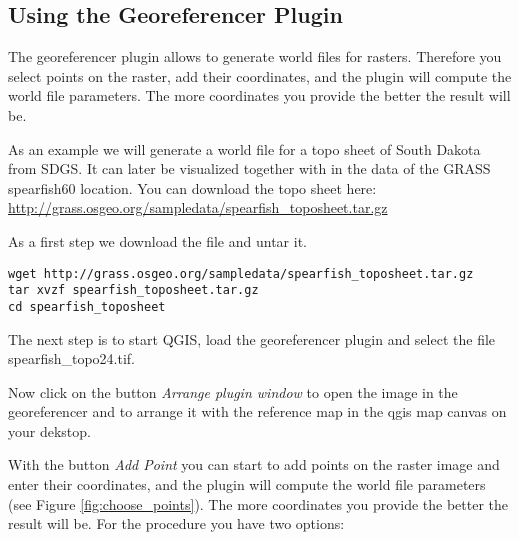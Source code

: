 \subsection{Using the Georeferencer Plugin}

The georeferencer plugin allows to generate world files for rasters. Therefore
you select points on the raster, add their coordinates, and the plugin will 
compute the world file parameters. The more coordinates you provide the better 
the result will be.

As an example we will generate a world file for a topo sheet of South Dakota 
from SDGS. It can later be visualized together with in the data of the GRASS 
spearfish60 location. You can download the topo sheet here: \\
\url{http://grass.osgeo.org/sampledata/spearfish\_toposheet.tar.gz}

As a first step we download the file and untar it.

\begin{verbatim}
wget http://grass.osgeo.org/sampledata/spearfish_toposheet.tar.gz
tar xvzf spearfish_toposheet.tar.gz
cd spearfish_toposheet
\end{verbatim}

The next step is to start QGIS, load the georeferencer plugin and select 
the file spearfish\_topo24.tif.


Now click on the button \textsl{Arrange plugin window} to open the image 
in the georeferencer and to arrange it with the reference map in the qgis map canvas on your dekstop.


With the button \textsl{Add Point} you can start to add points on the 
raster image and enter their coordinates, and the plugin will compute the 
world file parameters (see Figure \ref{fig:choose_points}). The more coordinates you provide the better the 
result will be. For the procedure you have two options:

